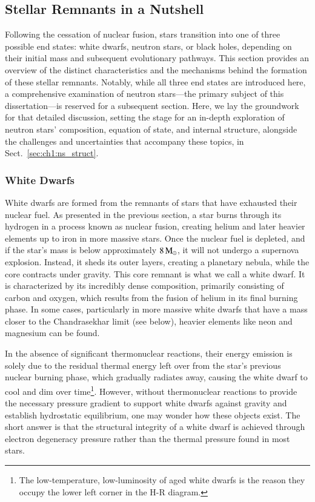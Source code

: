 \documentclass[main.tex]{subfiles}
\begin{document}
    

    \subsection{Stellar Remnants in a Nutshell}\label{sec:ch1:remnants}
    Following the cessation of nuclear fusion, stars transition into one of three possible end states: white dwarfs, neutron stars, or black holes, depending on their initial mass and subsequent evolutionary pathways. This section provides an overview of the distinct characteristics and the mechanisms behind the formation of these stellar remnants. Notably, while all three end states are introduced here, a comprehensive examination of neutron stars---the primary subject of this dissertation---is reserved for a subsequent section. Here, we lay the groundwork for that detailed discussion, setting the stage for an in-depth exploration of neutron stars' composition, equation of state, and internal structure, alongside the challenges and uncertainties that accompany these topics, in Sect.~\ref{sec:ch1:ns_struct}.
    
    \subsubsection{White Dwarfs}
    White dwarfs are formed from the remnants of stars that have exhausted their nuclear fuel. As presented in the previous section, a star burns through its hydrogen in a process known as nuclear fusion, creating helium and later heavier elements up to iron in more massive stars. Once the nuclear fuel is depleted, and if the star's mass is below approximately $8\mathrm{\,M_\odot}$, it will not undergo a supernova explosion. Instead, it sheds its outer layers, creating a planetary nebula, while the core contracts under gravity. This core remnant is what we call a white dwarf. It is characterized by its incredibly dense composition, primarily consisting of carbon and oxygen, which results from the fusion of helium in its final burning phase.  In some cases, particularly in more massive white dwarfs that have a mass closer to the Chandrasekhar limit (see below), heavier elements like neon and magnesium can be found.

    In the absence of significant thermonuclear reactions, their energy emission is solely due to the residual thermal energy left over from the star's previous nuclear burning phase, which gradually radiates away, causing the white dwarf to cool and dim over time\footnote{The low-temperature, low-luminosity of aged white dwarfs is the reason they occupy the lower left corner in the H-R diagram.}. However, without thermonuclear reactions to provide the necessary pressure gradient to support white dwarfs against gravity and establish hydrostatic equilibrium, one may wonder how these objects exist. The short answer is that the structural integrity of a white dwarf is achieved through electron degeneracy pressure rather than the thermal pressure found in most stars. 
\end{document}
